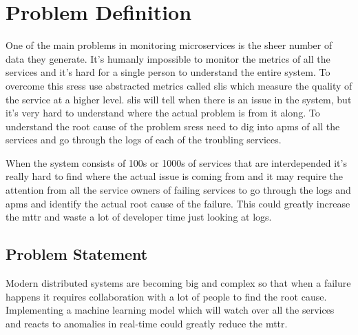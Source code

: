 \newpage

{\let\clearpage\relax \chapter{Problem Definition}}

One of the main problems in monitoring microservices is the sheer number of data they generate. It's humanly impossible to monitor the metrics of all the services and it's hard for a single person to understand the entire system. To overcome this \acp{sres} use abstracted metrics called \acp{sli} which measure the quality of the service at a higher level. \acp{sli} will tell when there is an issue in the system, but it's very hard to understand where the actual problem is from it along. To understand the root cause of the problem \acp{sres} need to dig into \acp{apm} of all the services and go through the logs of each of the troubling services.

When the system consists of 100s or 1000s of services that are interdepended it's really hard to find where the actual issue is coming from and it may require the attention from all the service owners of failing services to go through the logs and \acp{apm} and identify the actual root cause of the failure.
This could greatly increase the \ac{mttr} and waste a lot of developer time just looking at logs. \\

\section{Problem Statement}

Modern distributed systems are becoming big and complex so that when a failure happens it requires collaboration with a lot of people to find the root cause.  Implementing a machine learning model which will watch over all the services and reacts to anomalies in real-time could greatly reduce the \ac{mttr}.\\